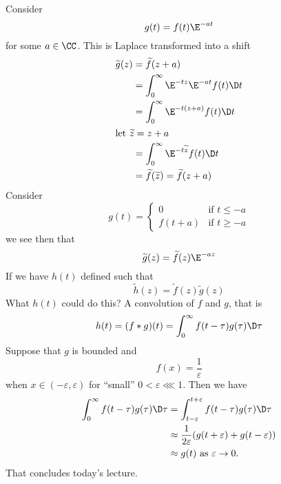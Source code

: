 Consider
\begin{equation}
g(t)=f(t)\E^{-at}
\end{equation}
for some $a\in\CC$. This is Laplace transformed into a shift
\begin{subequations}
\begin{align}
\widetilde{g}(z) &=\widetilde{f}(z+a)\\
&=\int^{\infty}_{0}\E^{-tz}\E^{-at}f(t)\D t\\
&=\int^{\infty}_{0}\E^{-t(z+a)}f(t)\D t\\
\intertext{let $\widetilde{z}=z+a$}
&=\int^{\infty}_{0}\E^{-t\widetilde{z}}f(t)\D t\\
&=\widetilde{f}(\widetilde{z})=\widetilde{f}(z+a)
\end{align}
\end{subequations}
Consider
\begin{equation}
g(t)=\begin{cases}0 & \mbox{if }t\leq-a\\
f(t+a)&\mbox{if }t\geq-a
\end{cases}
\end{equation}
we see then that
\begin{equation}
\widetilde{g}(z)=\widetilde{f}(z)\E^{-az}
\end{equation}
If we have $h(t)$ defined such that
\begin{equation}
\widetilde{h}(z)=\widetilde{f}(z)\widetilde{g}(z)
\end{equation}
What $h(t)$ could do this? A convolution of $f$ and $g$, that is
\begin{equation}
h(t)=(f*g)(t)=\int^{\infty}_{0}f(t-\tau)g(\tau)\D\tau
\end{equation}
Suppose that $g$ is bounded and 
\begin{equation}
f(x)=\frac{1}{\varepsilon}
\end{equation}
when $x\in(-\varepsilon,\varepsilon)$ for ``small'' $0<\varepsilon\lll1$.
Then we have
\begin{subequations}
\begin{align}
\int^{\infty}_{0}f(t-\tau)g(\tau)\D\tau
&=\int^{t+\varepsilon}_{t-\varepsilon}f(t-\tau)g(\tau)\D\tau\\
&\approx\frac{1}{2\varepsilon}(g(t+\varepsilon)+g(t-\varepsilon))\\
&\approx g(t)\mbox{ as }\varepsilon\to0.
\end{align}
\end{subequations}
That concludes today's lecture.
